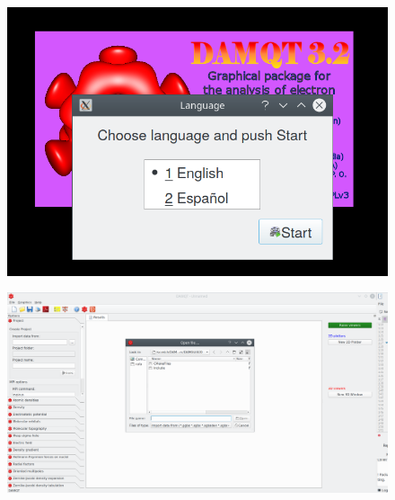 \documentclass[a4paper,10pt]{article}
\begin{document}
\begin{minipage}{.45\linewidth}
\begin{figure}[H]
\caption{\label{fig:1}}
\begin{center}
\includegraphics[width=0.95\linewidth]{damqt_QS_fig1.png}
\end{center}
\end{figure} 
\end{minipage}
\begin{minipage}{.5\linewidth}
\begin{figure}[H]
\caption{\label{fig:2}}
\begin{center}
\includegraphics[width=0.95\linewidth]{damqt_QS_fig2.png}
\end{center}
\end{figure} 
\end{minipage}
\end{document}
